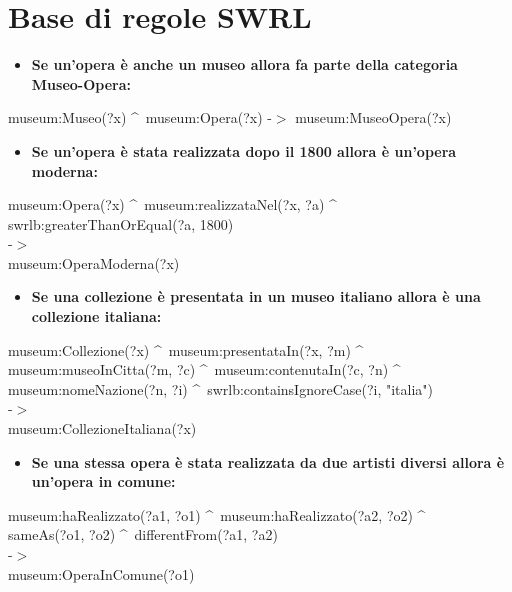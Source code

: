 \documentclass[12pt]{article}
\begin{document}
\newpage
\section{Base di regole SWRL}

\begin{itemize}
 \item \textbf{Se un’opera è anche un museo allora fa parte della categoria Museo-Opera:}		
\end{itemize} 
\begin{center}
museum:Museo(?x) \textasciicircum \, museum:Opera(?x) -$>$ museum:MuseoOpera(?x)
\end{center}

\begin{itemize}
 \item \textbf{Se un’opera è stata realizzata dopo il 1800 allora è un’opera moderna:}
\end{itemize} 
\begin{center}
museum:Opera(?x) \textasciicircum \, museum:realizzataNel(?x, ?a) \textasciicircum \, swrlb:greaterThanOrEqual(?a, 1800) \\
-$>$ \\
museum:OperaModerna(?x)
\end{center}

\begin{itemize}
 \item \textbf{Se una collezione è presentata in un museo italiano allora è una collezione italiana:}
\end{itemize} 
\begin{center}
museum:Collezione(?x) \textasciicircum \, museum:presentataIn(?x, ?m) \textasciicircum \\
museum:museoInCitta(?m, ?c) \textasciicircum \, museum:contenutaIn(?c, ?n) \textasciicircum \\
museum:nomeNazione(?n, ?i) \textasciicircum \, swrlb:containsIgnoreCase(?i, "italia") \\
-$>$ \\
museum:CollezioneItaliana(?x)
\end{center}

\begin{itemize}
 \item \textbf{Se una stessa opera è stata realizzata da due artisti diversi allora è un’opera in comune:}
\end{itemize} 
\begin{center}
museum:haRealizzato(?a1, ?o1) \textasciicircum \, museum:haRealizzato(?a2, ?o2) \textasciicircum \\
sameAs(?o1, ?o2) \textasciicircum \, differentFrom(?a1, ?a2) \\
-$>$ \\
museum:OperaInComune(?o1)
\end{center}
\end{document}
